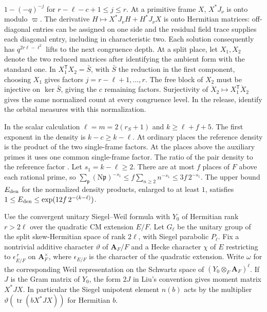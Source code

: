 \(1-(-q)^{-j}\) for \(r-\ell-c+1\le j\le r\).
At a primitive frame \(X\), \(X^*J_\nu\) is onto modulo \(\varpi\).
The derivative \(H\mapsto X^*J_\nu H+H^*J_\nu X\) is onto Hermitian
matrices: off-diagonal entries can be assigned on one side and the
residual field trace supplies each diagonal entry, including in
characteristic two. Each solution consequently has
\(q^{2r\ell-\ell^2}\) lifts to the next congruence depth.
At a split place, let \(X_1,X_2\) denote the two reduced matrices after
identifying the ambient form with the standard one. In
\(X_1^{\mathsf T}X_2=\bar S\), with \(\bar S\) the reduction in the
first component, choosing \(X_1\) gives factors
\(j=r-\ell+1,\ldots,r\). The free block of \(X_2\) must be injective on
\(\ker\bar S\), giving the \(c\) remaining factors. Surjectivity of
\(\dot X_2\mapsto X_1^{\mathsf T}\dot X_2\) gives the same normalized count
at every congruence level. In the release,
identify the orbital measures with this normalization.

In the scalar calculation \(\ell=m=2(r_S+1)\) and
\(k\ge \ell+f+5\). The first exponent in the density is
\(k-c\ge k-\ell\). At ordinary places the reference density is the
product of the two single-frame factors. At the places above the
auxiliary primes it uses one common single-frame factor. The ratio
of the pair density to the reference factor
.
Let \(s_1=k-\ell\ge2\). There are at most \(f\) places of \(F\) above
each rational prime, so
\(\sum_{\mathfrak p}(\mathrm N\mathfrak p)^{-s_1}\le
f\sum_{n\ge2}n^{-s_1}\le3f\,2^{-s_1}\).
The upper bound \(E_{\rm den}\) for the normalized density products,
enlarged to at least \(1\), satisfies
\(1\le E_{\rm den}\le\exp(12f\,2^{-(k-\ell)})\).

\leavevmode{}%
Use the convergent unitary Siegel--Weil formula with \(Y_0\) of
Hermitian rank \(r>2\ell\) over the quadratic CM extension \(E/F\).
Let \(G_\ell\) be the unitary group of the split skew-Hermitian space of
rank \(2\ell\), with Siegel parabolic \(P_\ell\). Fix a nontrivial
additive character \(\vartheta\) of \(\mathbf A_F/F\) and a Hecke
character \(\chi\) of \(E\) restricting to \(\epsilon_{E/F}^{\,r}\) on
\(\mathbf A_F^\times\), where \(\epsilon_{E/F}\) is the character of the
quadratic extension. Write \(\omega\) for the corresponding Weil
representation on the Schwartz space of
\((Y_0\otimes_F\mathbf A_F)^\ell\).
If \(J\) is the Gram matrix of \(Y_0\), the form \(2J\) in Liu's
convention gives moment matrix \(X^*JX\). In particular the Siegel
unipotent element \(n(b)\) acts by the multiplier
\(\vartheta(\operatorname{tr}(bX^*JX))\) for Hermitian \(b\).

